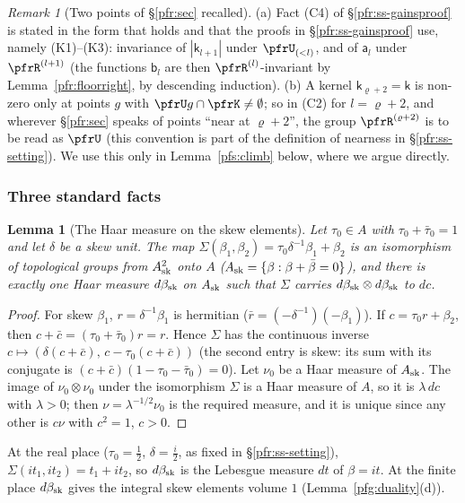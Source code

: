 \documentclass[10pt]{amsart}
\newtheorem{lemma}[theorem]{Lemma}
\theoremstyle{definition}
\theoremstyle{remark}
\newtheorem{remark}[theorem]{Remark}
\begin{document}
\begin{remark}[Two points of \S\ref{pfr:sec} recalled]\label{pfs:rem-corr}
(a) Fact (C4) of \S\ref{pfr:ss-gainsproof} is stated in the form that holds and that the proofs in
\S\ref{pfr:ss-gainsproof} use, namely (K1)--(K3): invariance of $|\mathsf k_{l+1}|$ under $\pfrU_{(<l)}$, and of
$\mathsf a_l$ under $\pfrR^{(l+1)}$ (the functions $\mathsf b_l$ are then $\pfrR^{(l)}$-invariant by
Lemma~\ref{pfr:floorright}, by descending induction). (b) A kernel
$\mathsf k_{\varrho+2}=\mathsf k$ is non-zero only at points $g$ with $\pfrU g\cap\pfrK\ne\emptyset$; so in (C2) for
$l=\varrho+2$, and wherever \S\ref{pfr:sec} speaks of points ``near at $\varrho+2$'', the group $\pfrR^{(\varrho+2)}$ is
to be read as $\pfrU$ (this convention is part of the definition of nearness in \S\ref{pfr:ss-setting}). We use this only in Lemma~\ref{pfs:climb} below, where
we argue directly.
\end{remark}

\subsubsection*{Three standard facts}
\begin{lemma}[The Haar measure on the skew elements]\label{pfs:skewhaar}
Let $\tau_0\in A$ with $\tau_0+\bar\tau_0=1$ and let $\delta$ be a skew unit. The map
$\Sigma(\beta_1,\beta_2)=\tau_0\delta^{-1}\beta_1+\beta_2$ is an isomorphism of topological groups from
$A_{\rm sk}^2$ onto $A$ ($A_{\rm sk}=\{\beta:\beta+\bar\beta=0\}$), and there is exactly one Haar measure
$d\beta_{\rm sk}$ on $A_{\rm sk}$ such that $\Sigma$ carries $d\beta_{\rm sk}\otimes d\beta_{\rm sk}$ to $dc$.
\end{lemma}
\begin{proof}
For skew $\beta_1$, $r=\delta^{-1}\beta_1$ is hermitian ($\bar r=(-\delta^{-1})(-\beta_1)$). If
$c=\tau_0r+\beta_2$, then $c+\bar c=(\tau_0+\bar\tau_0)r=r$. Hence $\Sigma$ has the continuous inverse
$c\mapsto(\delta(c+\bar c),\,c-\tau_0(c+\bar c))$ (the second entry is skew: its sum with its conjugate is
$(c+\bar c)(1-\tau_0-\bar\tau_0)=0$). Let $\nu_0$ be a Haar measure of $A_{\rm sk}$. The image of $\nu_0\otimes\nu_0$
under the isomorphism $\Sigma$ is a Haar measure of $A$, so it is $\lambda\,dc$ with $\lambda>0$; then
$\nu=\lambda^{-1/2}\nu_0$ is the required measure, and it is unique since any other is $c\nu$ with $c^2=1$,
$c>0$.
\end{proof}
At the real place ($\tau_0=\frac12$, $\delta=\frac i2$, as fixed in \S\ref{pfr:ss-setting}), $\Sigma(it_1,it_2)=t_1+it_2$, so
$d\beta_{\rm sk}$ is the Lebesgue measure $dt$ of $\beta=it$. At the finite place $d\beta_{\rm sk}$ gives the integral skew elements
volume $1$ (Lemma~\ref{pfg:duality}(d)).
\end{document}
